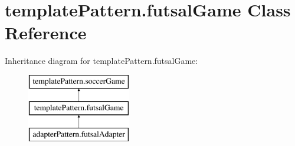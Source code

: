 \hypertarget{classtemplate_pattern_1_1futsal_game}{}\section{template\+Pattern.\+futsal\+Game Class Reference}
\label{classtemplate_pattern_1_1futsal_game}
Inheritance diagram for template\+Pattern.\+futsal\+Game\+:\begin{figure}[H]
\begin{center}
\leavevmode
\includegraphics[height=3.000000cm]{classtemplate_pattern_1_1futsal_game}
\end{center}
\end{figure}
